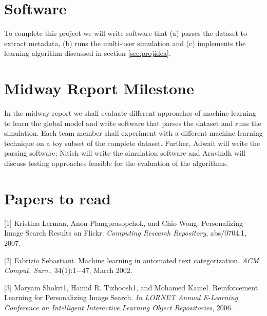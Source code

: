 \documentclass{article} %
\begin{document}
\section{Software}
\vspace{-0.125in}
To complete this project we will write software that (a) parses the dataset to extract metadata, (b) runs the multi-user simulation and (c) implements the learning algorithm discussed in section \ref{sec:projidea}.
\vspace{-0.125in}
\section{Midway Report Milestone}
\vspace{-0.125in}
In the midway report we shall evaluate different approaches of machine learning to learn the global model and write software that parses the dataset and runs the simulation. Each team member shall experiment with a different machine learning technique on a toy subset of the complete dataset. Further, Adwait will write the parsing software; Nitish will write the simulation software and Aravindh will discuss testing approaches feasible for the evaluation of the algorithms.
\vspace{-0.125in}
\section{Papers to read}
\vspace{-0.125in}
[1] Kristina Lerman, Anon Plangprasopchok, and Chio Wong. Personalizing Image Search Results
on Flickr. \textit{Computing Research Repository}, abs/0704.1, 2007.

[2] Fabrizio Sebastiani. Machine learning in automated text categorization. \textit{ACM Comput. Surv.},
34(1):1$-$47, March 2002. 

[3] Maryam Shokri1, Hamid R. Tizhoosh1, and Mohamed Kamel. Reinforcement Learning for Personalizing
Image Search. \textit{In LORNET Annual E-Learning Conference on Intelligent Interactive
Learning Object Repositories}, 2006.
\end{document}
